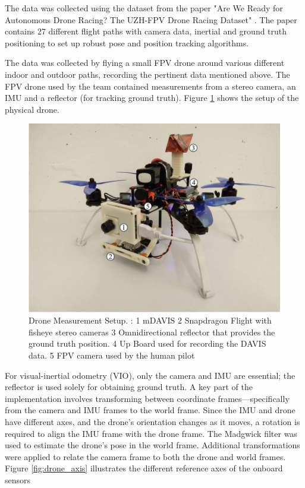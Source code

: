 \documentclass[bare_jrnl_transmag]{subfiles}
\begin{document}
The data was collected using the dataset from the paper "Are We Ready for Autonomous Drone Racing?
The UZH-FPV Drone Racing Dataset" \cite{Delmerico19icra}. The paper contains 27 different flight paths with camera data, inertial and ground truth positioning to set up robust pose and position tracking algorithms. \newline

The data was collected by flying a small FPV drone around various different indoor and outdoor paths, recording the pertinent data mentioned above. The FPV drone used by the team contained measurements from a stereo camera, an IMU and a reflector (for tracking ground truth). Figure  \ref{fig:drone_setup} shows the setup of the physical drone.

\begin{figure}[H]
    \centering
    \includegraphics[width=0.8\linewidth]{figures/drone_setup.jpg}
    \caption{Drone Measurement Setup. : 
    1 mDAVIS 2 Snapdragon Flight with fisheye stereo cameras 3 Omnidirectional reflector that provides the ground truth position. 4 Up Board
    used for recording the DAVIS data. 5 FPV camera used by the human pilot \cite{Delmerico19icra}}
    \label{fig:drone_setup}
\end{figure}

For visual-inertial odometry (VIO), only the camera and IMU are essential; the reflector is used solely for obtaining ground truth. A key part of the implementation involves transforming between coordinate frames—specifically from the camera and IMU frames to the world frame. Since the IMU and drone have different axes, and the drone’s orientation changes as it moves, a rotation is required to align the IMU frame with the drone frame. The Madgwick filter was used to estimate the drone’s pose in the world frame. Additional transformations were applied to relate the camera frame to both the drone and world frames. Figure \ref{fig:drone_axis} illustrates the different reference axes of the onboard sensors
\end{document}
